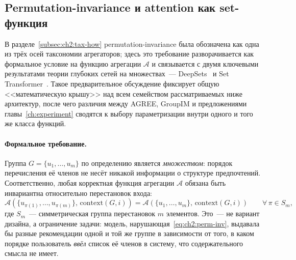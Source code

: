 \subsection{Permutation-invariance и attention как set-функция}
\label{subsec:ch2:set-function}

В разделе~\ref{subsec:ch2:tax-how} permutation-invariance была обозначена как одна из трёх осей таксономии агрегаторов; здесь это требование разворачивается как формальное условие на функцию агрегации $\mathcal{A}$ и связывается с двумя ключевыми результатами теории глубоких сетей на множествах~--- DeepSets~\cite{zaheer2017deepsets} и Set Transformer~\cite{lee2019settransformer}. Такое предварительное обсуждение фиксирует общую <<математическую крышу>> над всем семейством рассматриваемых ниже архитектур, после чего различия между AGREE, GroupIM и предложениями главы~\ref{ch:experiment} сводятся к выбору параметризации внутри одного и того же класса функций.

\paragraph{Формальное требование.} Группа $G = \{u_1, \ldots, u_m\}$ по определению является \emph{множеством}: порядок перечисления её членов не несёт никакой информации о структуре предпочтений. Соответственно, любая корректная функция агрегации $\mathcal{A}$ обязана быть инвариантна относительно перестановок входа:
\begin{equation}
    \mathcal{A}\!\left(\{u_{\pi(1)}, \ldots, u_{\pi(m)}\},\, \mathrm{context}(G, i)\right)
    =
    \mathcal{A}\!\left(\{u_1, \ldots, u_m\},\, \mathrm{context}(G, i)\right)
    \qquad \forall\, \pi \in S_m,
    \label{eq:ch2:perm-inv}
\end{equation}
где $S_m$~--- симметрическая группа перестановок $m$ элементов. Это~--- не вариант дизайна, а ограничение задачи: модель, нарушающая~\eqref{eq:ch2:perm-inv}, выдавала бы разные рекомендации одной и той же группе в зависимости от того, в каком порядке пользователь \emph{ввёл} список её членов в систему, что содержательного смысла не имеет.

